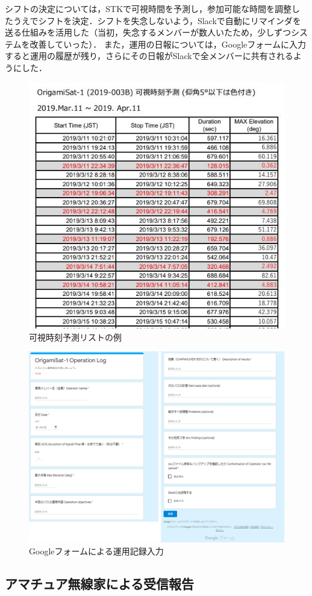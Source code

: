 シフトの決定については，STKで可視時間を予測し，参加可能な時間を調整したうえでシフトを決定．シフトを失念しないよう，Slackで自動にリマインダを送る仕組みを活用した（当初，失念するメンバーが数人いたため，少しずつシステムを改善していった）．
また，運用の日報については，Googleフォームに入力すると運用の履歴が残り，さらにその日報がSlackで全メンバーに共有されるようにした．
\begin{figure}[H]
	\centering
	\includegraphics[width=.8\textwidth]{07/fig/7-1-1.jpg}
	\caption{可視時刻予測リストの例}
	\label{fig7-1-1}
\end{figure}
\begin{figure}[H]
	\centering
	\includegraphics[width=.8\textwidth]{07/fig/7-1-2.png}
	\caption{Googleフォームによる運用記録入力}
	\label{fig7-1-2}
\end{figure}

\subsection{アマチュア無線家による受信報告}

